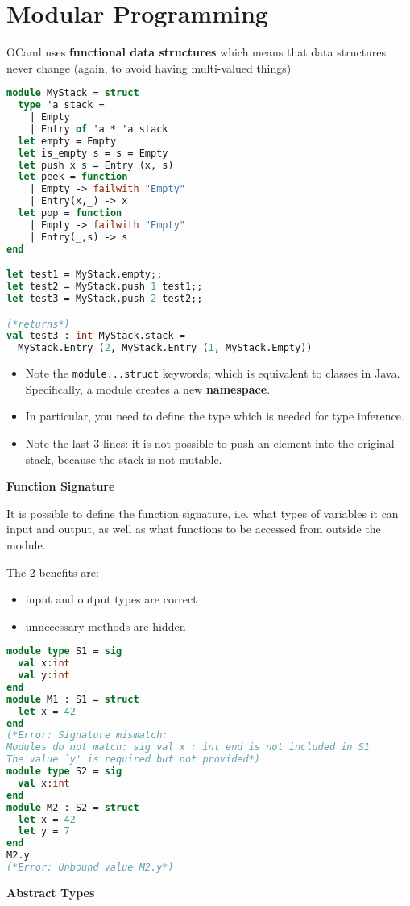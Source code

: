 \documentclass[12pt,a4paper]{article} %
\begin{document}
\section{Modular Programming}
OCaml uses \textbf{functional data structures} which means that data structures never change (again, to avoid having multi-valued things)
\begin{lstlisting}[language=Caml]
module MyStack = struct
  type 'a stack =
    | Empty
    | Entry of 'a * 'a stack
  let empty = Empty
  let is_empty s = s = Empty
  let push x s = Entry (x, s)
  let peek = function
    | Empty -> failwith "Empty"
    | Entry(x,_) -> x
  let pop = function
    | Empty -> failwith "Empty"
    | Entry(_,s) -> s
end

let test1 = MyStack.empty;;
let test2 = MyStack.push 1 test1;;
let test3 = MyStack.push 2 test2;;

(*returns*)
val test3 : int MyStack.stack =
  MyStack.Entry (2, MyStack.Entry (1, MyStack.Empty))
\end{lstlisting}
\begin{itemize}
	\item Note the \verb|module...struct| keywords; which is equivalent to classes in Java. Specifically, a module creates a new \textbf{namespace}.
	\item In particular, you need to define the type which is needed for type inference.
	\item Note the last 3 lines: it is not possible to push an element into the original stack, because the stack is not mutable.
\end{itemize}
\textbf{Function Signature}

It is possible to define the function signature, i.e. what types of variables it can input and output, as well as what functions to be accessed from outside the module.

The 2 benefits are:
\begin{itemize}
	\item input and output types are correct
	\item unnecessary methods are hidden
\end{itemize}
\begin{lstlisting}[language=Caml]
module type S1 = sig
  val x:int
  val y:int
end
module M1 : S1 = struct
  let x = 42
end
(*Error: Signature mismatch:
Modules do not match: sig val x : int end is not included in S1
The value `y' is required but not provided*)
module type S2 = sig
  val x:int
end
module M2 : S2 = struct
  let x = 42
  let y = 7
end
M2.y
(*Error: Unbound value M2.y*)
\end{lstlisting}
\textbf{Abstract Types}
\end{document}

